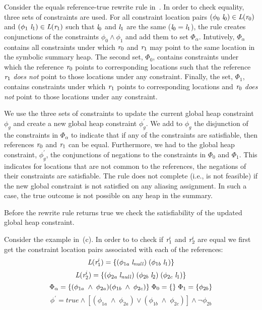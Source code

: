 Consider the equals reference-true rewrite rule
in~. In order to check equality, three
sets of constraints are used. For all constraint location pairs $(\phi_0\ \emph{l}_0)
\in \emph{L}(\emph{r}_0)$ and $(\phi_1\ \emph{l}_1) \in \emph{L}(\emph{r}_1)$ such that $\emph{l}_0$ and $\emph{l}_1$
are the same ($\emph{l}_0 = \emph{l}_1$), the rule creates conjunctions of the constraints
$\phi_0 \wedge \phi_1$ and add them to set $\Phi_\alpha$. Intutively,
$\Phi_\alpha$ contains all constraints under which $\emph{r}_0$ and $\emph{r}_1$ may
point to the same location in the symbolic summary heap. The second
set, $\Phi_0$, contains constraints under which the reference $\emph{r}_0$
points to corresponding locations such that the reference $\emph{r}_1$
\emph{does not} point to those locations under any
constraint. Finally, the set, $\Phi_1$, contains constraints under
which $\emph{r}_1$ points to corresponding locations and $\emph{r}_0$ \emph{does
  not} point to those locations under any constraint.

We use the three sets of constraints to update the current global heap
constraint $\phi_g$ and create a new global heap constraint
$\phi_g^\prime$. We add to $\phi_g$ the disjunction of the constraints
in $\Phi_\alpha$ to indicate that if any of the constraints are
satisfiable, then references $\emph{r}_0$ and $\emph{r}_1$ can be
equal. Furthermore, we had to the global heap constraint,
$\phi_g^\prime$, the conjunctions of negations to the constraints in
$\Phi_0$ and $\Phi_1$. This indicates for locations that are not
common to the references, the negations of their constraints are
satisfiable. The rule does not complete (i.e., is not feasible) if the new global constraint is not satisfied on any aliasing assignment. In such a case, the true outcome is not possible on any heap in the summary.

Before the rewrite rule returns true we check the
satisfiability of the updated global heap constraint.

Consider the example in~(c). In order to to check
if $\emph{r}_1^i$ and $\emph{r}_2^i$ are equal we first get the constraint location
pairs associated with each of the references:
\[
\emph{L}(\emph{r}_1^i) = \{ (\phi_{1a}\; \emph{l}_\mathit{null})\; (\phi_{1b}\; \emph{l}_1) \} 
\]
\[
\emph{L}(\emph{r}_2^i) = \{ (\phi_{2a}\; \emph{l}_\mathit{null})\; (\phi_{2b}\; \emph{l}_2)\; (\phi_{2c}\; \emph{l}_1) \} \\
\]
\[
\Phi_\alpha = \{ (\phi_{1a}\; \wedge\; \phi_{2a} ) (\phi_{1b}\; \wedge\; \phi_{2c} ) \}\;
\Phi_0 = \{ \}\; \Phi_1 = \{ \phi_{2b}\} \\
\]
\[
\phi^\prime = \mathit{true} \wedge [ (\phi_{1a}\; \wedge\; \phi_{2a} )\vee (\phi_{1b}\; \wedge\; \phi_{2c} ) ] \wedge \neg\phi_{2b} 
\]
